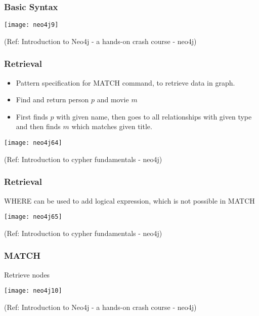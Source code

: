 \begin{frame}[fragile]\frametitle{Basic Syntax}

\begin{center}
\texttt{[image: neo4j9]}
\end{center}	  


{\tiny (Ref: Introduction to Neo4j - a hands-on crash course  - neo4j)}

\end{frame}

\begin{frame}[fragile]\frametitle{Retrieval}


\begin{itemize}
\item Pattern specification for MATCH command, to retrieve data in graph.
\item Find and return person $p$ and movie $m$
\item First finds $p$ with given name, then goes to all relationships with given type and then finds $m$ which matches given title.
\end{itemize}


\begin{center}
\texttt{[image: neo4j64]}
\end{center}	  


{\tiny (Ref: Introduction to cypher fundamentals  - neo4j)}

\end{frame}

\begin{frame}[fragile]\frametitle{Retrieval}

WHERE can be used to add logical expression, which is not possible in MATCH

\begin{center}
\texttt{[image: neo4j65]}
\end{center}	  


{\tiny (Ref: Introduction to cypher fundamentals  - neo4j)}

\end{frame}



\begin{frame}[fragile]\frametitle{MATCH}

Retrieve nodes

\begin{center}
\texttt{[image: neo4j10]}
\end{center}	  


{\tiny (Ref: Introduction to Neo4j - a hands-on crash course  - neo4j)}

\end{frame}

